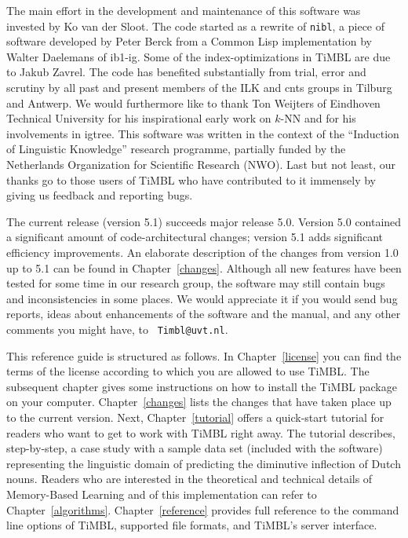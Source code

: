 \documentclass{report}
\begin{document}
The main effort in the development and maintenance of this software
was invested by Ko van der Sloot. The code started as a rewrite of
{\tt nibl}, a piece of software developed by Peter Berck from a Common
Lisp implementation by Walter Daelemans of {\sc ib1-ig}. Some of the
index-optimizations in TiMBL are due to Jakub Zavrel. The code has
benefited substantially from trial, error and scrutiny by all past and
present members of the ILK and {\sc cnts} groups in Tilburg and
Antwerp. We would furthermore like to thank Ton Weijters of Eindhoven
Technical University for his inspirational early work on $k$-NN and
for his involvements in {\sc igtree}. This software was written in
the context of the ``Induction of Linguistic Knowledge'' research
programme, partially funded by the Netherlands Organization for
Scientific Research (NWO). Last but not least, our thanks go to those
users of TiMBL who have contributed to it immensely by giving us
feedback and reporting bugs.

The current release (version 5.1) succeeds major release 5.0. Version
5.0 contained a significant amount of code-architectural changes;
version 5.1 adds significant efficiency improvements.  An elaborate
description of the changes from version 1.0 up to 5.1 can be found in
Chapter~\ref{changes}. Although all new features have been tested for
some time in our research group, the software may still contain bugs
and inconsistencies in some places. We would appreciate it if you
would send bug reports, ideas about enhancements of the software and
the manual, and any other comments you might have, to {\tt
  Timbl@uvt.nl}.

This reference guide is structured as follows. In
Chapter~\ref{license} you can find the terms of the license according
to which you are allowed to use TiMBL. The subsequent chapter gives
some instructions on how to install the TiMBL package on your
computer. Chapter~\ref{changes} lists the changes that have taken
place up to the current version. Next, Chapter~\ref{tutorial} offers a
quick-start tutorial for readers who want to get to work with TiMBL
right away. The tutorial describes, step-by-step, a case study with a
sample data set (included with the software) representing the
linguistic domain of predicting the diminutive inflection of Dutch
nouns.  Readers who are interested in the theoretical and technical
details of Memory-Based Learning and of this implementation can refer
to Chapter~\ref{algorithms}. Chapter~\ref{reference} provides full
reference to the command line options of TiMBL, supported file
formats, and TiMBL's server interface.
\end{document}
